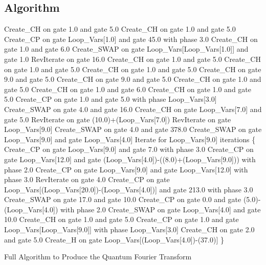 \subsection{Algorithm}
\label{sec:evoqftalgo}
\begin{algorithm}
 \begin{algorithmic}
\STATE Create\_CH on gate 1.0 and gate 5.0
\STATE Create\_CH on gate 1.0 and gate 5.0
\STATE Create\_CP on gate Loop\_Vars[1.0] and gate 45.0 with phase 3.0
\STATE Create\_CH on gate 1.0 and gate 6.0
\STATE Create\_SWAP on gate Loop\_Vars[Loop\_Vars[1.0]] and gate 1.0
\STATE RevIterate on gate 16.0
\STATE Create\_CH on gate 1.0 and gate 5.0
\STATE Create\_CH on gate 1.0 and gate 5.0
\STATE Create\_CH on gate 1.0 and gate 5.0
\STATE Create\_CH on gate 9.0 and gate 5.0
\STATE Create\_CH on gate 9.0 and gate 5.0
\STATE Create\_CH on gate 1.0 and gate 5.0
\STATE Create\_CH on gate 1.0 and gate 6.0
\STATE Create\_CH on gate 1.0 and gate 5.0
\STATE Create\_CP on gate 1.0 and gate 5.0 with phase Loop\_Vars[3.0]
\STATE Create\_SWAP on gate 4.0 and gate 16.0
\STATE Create\_CH on gate Loop\_Vars[7.0] and gate 5.0
\STATE RevIterate on gate (10.0)+(Loop\_Vars[7.0])
\STATE RevIterate on gate Loop\_Vars[9.0]
\STATE Create\_SWAP on gate 4.0 and gate 378.0
\STATE Create\_SWAP on gate Loop\_Vars[9.0] and gate Loop\_Vars[4.0]
\STATE Iterate for Loop\_Vars[9.0] iterations \{
\STATE Create\_CP on gate Loop\_Vars[9.0] and gate 7.0 with phase 3.0
\STATE Create\_CP on gate Loop\_Vars[12.0] and gate (Loop\_Vars[4.0])-((8.0)+(Loop\_Vars[9.0])) with phase 2.0
\STATE Create\_CP on gate Loop\_Vars[9.0] and gate Loop\_Vars[12.0] with phase 3.0
\STATE RevIterate on gate 4.0
\STATE Create\_CP on gate Loop\_Vars[(Loop\_Vars[20.0])-(Loop\_Vars[4.0])] and gate 213.0 with phase 3.0
\STATE Create\_SWAP on gate 17.0 and gate 10.0
\STATE Create\_CP on gate 0.0 and gate (5.0)-(Loop\_Vars[4.0]) with phase 2.0
\STATE Create\_SWAP on gate Loop\_Vars[4.0] and gate 10.0
\STATE Create\_CH on gate 1.0 and gate 5.0
\STATE Create\_CP on gate 1.0 and gate Loop\_Vars[Loop\_Vars[9.0]] with phase Loop\_Vars[3.0]
\STATE Create\_CH on gate 2.0 and gate 5.0
\STATE Create\_H on gate Loop\_Vars[(Loop\_Vars[4.0])-(37.0)]
\STATE \}
 \end{algorithmic}
\caption{Full Algorithm to Produce the Quantum Fourier Transform}
\label{alg:qftfullalg}
\end{algorithm}


\clearpage
